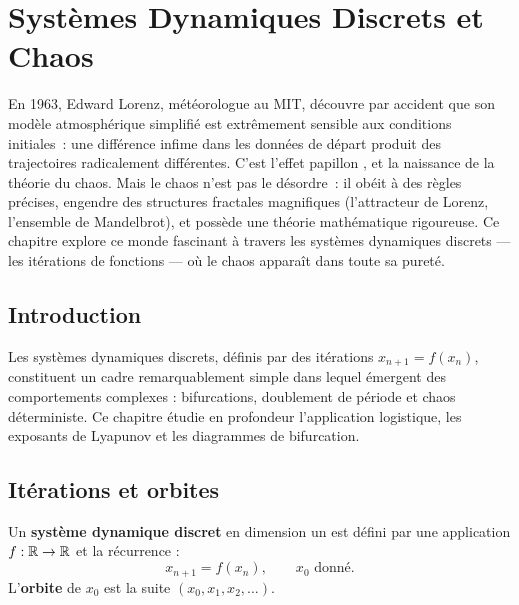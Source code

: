 \chapter{Syst\`emes Dynamiques Discrets et Chaos}
\label{ch:chaos}

En 1963, Edward Lorenz, m\'et\'eorologue au MIT, d\'ecouvre par accident que son mod\`ele atmosph\'erique simplifi\'e est extr\^emement sensible aux conditions initiales~: une diff\'erence infime dans les donn\'ees de d\'epart produit des trajectoires radicalement diff\'erentes. C'est l'\og effet papillon \fg, et la naissance de la th\'eorie du chaos. Mais le chaos n'est pas le d\'esordre~: il ob\'eit \`a des r\`egles pr\'ecises, engendre des structures fractales magnifiques (l'attracteur de Lorenz, l'ensemble de Mandelbrot), et poss\`ede une th\'eorie math\'ematique rigoureuse. Ce chapitre explore ce monde fascinant \`a travers les syst\`emes dynamiques discrets --- les it\'erations de fonctions --- o\`u le chaos appara\^it dans toute sa puret\'e.

\section{Introduction}

Les syst\`emes dynamiques discrets, d\'efinis par des it\'erations
$x_{n+1}=f(x_n)$, constituent un cadre remarquablement simple dans
lequel \'emergent des comportements complexes : bifurcations,
doublement de p\'eriode et chaos d\'eterministe.  Ce chapitre
\'etudie en profondeur l'application logistique, les exposants de
Lyapunov et les diagrammes de bifurcation.

\section{It\'erations et orbites}

\begin{definition}
Un \textbf{syst\`eme dynamique discret} en dimension un est d\'efini
par une application $f:\mathbb{R}\to\mathbb{R}$ et la r\'ecurrence :
\[
  x_{n+1} = f(x_n), \qquad x_0 \text{ donn\'e}.
\]
L'\textbf{orbite} de $x_0$ est la suite $(x_0, x_1, x_2, \ldots)$.
\end{definition}

